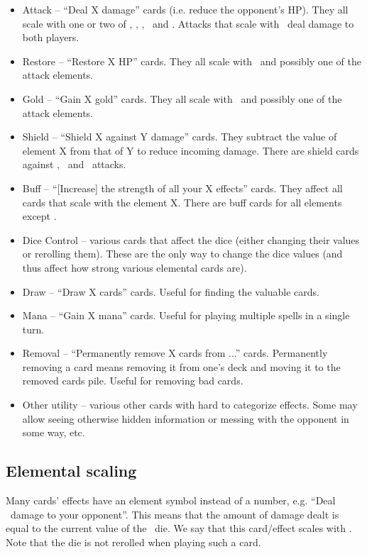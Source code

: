 \documentclass[dvipsnames,parskip,a4paper]{scrartcl}
\newcommand{\iconsize}{3.4mm}
\newcommand{\icondepth}{0.45mm}
\newcommand{\icon}[1]{\raisebox{-\icondepth}{\texttt{[image:  \#1 ]}}}
\newcommand{\fire}{\icon{icons/fire.png}}
\newcommand{\earth}{\icon{icons/earth.png}}
\newcommand{\water}{\icon{icons/water.png}}
\newcommand{\nature}{\icon{icons/nature.png}}
\newcommand{\magic}{\icon{icons/magic.png}}
\newcommand{\gold}{\icon{icons/gold.png}}
\newcommand{\chance}{\icon{icons/chance.png}}
\begin{document}
\begin{itemize}
\item Attack -- ``Deal X damage'' cards (i.e. reduce the opponent's HP). They all scale with one or two of \fire, \earth, \water, \chance \ and \magic. Attacks that scale with \water \ deal damage to both players.
\item Restore -- ``Restore X HP'' cards. They all scale with \nature \ and possibly one of the attack elements.
\item Gold -- ``Gain X gold'' cards. They all scale with \gold \ and possibly one of the attack elements.
\item Shield -- ``Shield X against Y damage'' cards. They subtract the value of element X from that of Y to reduce incoming damage. There are shield cards against \fire, \earth \ and \water \ attacks.
\item Buff -- ``[Increase] the strength of all your X effects'' cards. They affect all cards that scale with the element X. There are buff cards for all elements except \chance.
\item Dice Control -- various cards that affect the dice (either changing their values or rerolling them). These are the only way to change the dice values (and thus affect how strong various elemental cards are).
\item Draw -- ``Draw X cards'' cards. Useful for finding the valuable cards.
\item Mana -- ``Gain X mana'' cards. Useful for playing multiple spells in a single turn.
\item Removal -- ``Permanently remove X cards from ...'' cards. Permanently removing a card means removing it from one's deck and moving it to the removed cards pile. Useful for removing bad cards.
\item Other utility -- various other cards with hard to categorize effects. Some may allow seeing otherwise hidden information or messing with the opponent in some way, etc.
\end{itemize}

\newpage

\subsection*{Elemental scaling}

Many cards' effects have an element symbol instead of a number, e.g. ``Deal \fire \ damage to your opponent''. This means that the amount of damage dealt is equal to the current value of the \fire \ die. We say that this card/effect scales with \fire. Note that the die is not rerolled when playing such a card.
\end{document}

